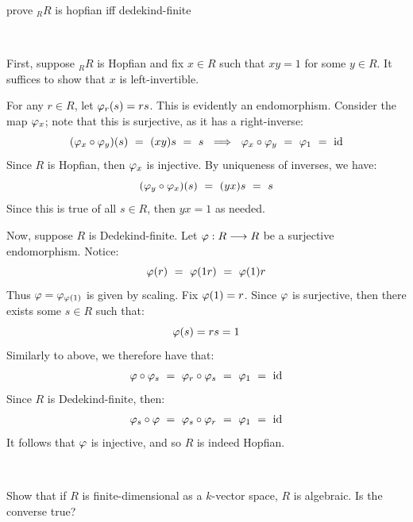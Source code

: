 \begin{exr}[title=Exercise 1.12 part b)]
    prove $_{R}R$ is hopfian iff dedekind-finite
\end{exr} \

\begin{pf}[source=Primary Source Material]
	First, suppose $_{R}R$ is Hopfian and fix $x\in R$ such that $xy=1$
	for some $y\in R$.
	It suffices to show that $x$ is left-invertible.

	For any $r\in R$, let $\varphi_{r}(s)=rs$. This is evidently an endomorphism.
	Consider the map $\varphi_{x}$; note that this is surjective, as it has
	a right-inverse:
	\begin{equation*}
		(\varphi_{x}\circ\varphi_{y})(s) \ = \ (xy)s \ = \ s
		\ \implies \
		\varphi_{x}\circ\varphi_{y} \ = \ \varphi_{1} \ = \ \textrm{id}
	\end{equation*}
	Since $R$ is Hopfian, then $\varphi_{x}$ is injective.
	By uniqueness of inverses, we have:
	\begin{equation*}
		(\vphi_{y}\circ\vphi_{x})(s) \ = \ (yx)s \ = \ s
	\end{equation*}
	Since this is true of all $s \in R$, then $yx=1$ as needed.

	Now, suppose $R$ is Dedekind-finite.
	Let $\varphi:R\longrightarrow R$ be a surjective endomorphism. Notice:
	\begin{equation*}
	    \varphi(r) \ = \ \varphi(1r) \ = \ \varphi(1)r
	\end{equation*}
	Thus $\varphi=\varphi_{\varphi(1)}$ is given by scaling.
	Fix $\varphi(1)=r$.
	Since $\varphi$ is surjective, then there exists some $s\in R$ such that:
	\begin{equation*}
	    \varphi(s)=rs = 1
	\end{equation*}
	Similarly to above, we therefore have that:
	\begin{equation*}
	    \varphi\circ\varphi_{s} \ = \ \varphi_{r}\circ\varphi_{s}
		\ = \ \varphi_{1} \ = \ \textrm{id}
	\end{equation*}
	Since $R$ is Dedekind-finite, then:
	\begin{equation*}
	    \varphi_{s}\circ\varphi \ = \ \varphi_{s}\circ\varphi_{r}
		\ = \ \varphi_{1} \ = \ \textrm{id}
	\end{equation*}
	It follows that $\varphi$ is injective, and so $R$ is indeed Hopfian.
\end{pf} \


\nq
\begin{exr}[title=Exercise 1.13 part a)]
	Show that if $R$ is finite-dimensional as a $k$-vector space,
	$R$ is algebraic. Is the converse true?
\end{exr} \

